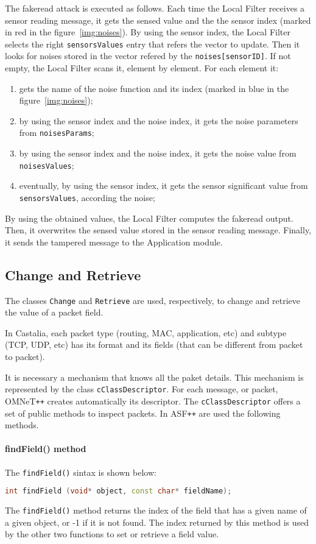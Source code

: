 The fakeread attack is executed as follows. Each time the Local Filter receives a sensor reading message, it gets the sensed value and the the sensor index (marked in red in the figure~\ref{img:noises}). By using the sensor index, the Local Filter selects the right \texttt{sensorsValues} entry that refers the vector to update. Then it looks for noises stored in the vector refered by the \texttt{noises[sensorID]}. If not empty, the Local Filter scans it, element by element. For each element it:
%
\begin{enumerate}
\item gets the name of the noise function and its index (marked in blue in the figure~\ref{img:noises});
\item by using the sensor index and the noise index, it gets the noise parameters from \texttt{noisesParams};
\item by using the sensor index and the noise index, it gets the noise value from \texttt{noisesValues};
\item eventually, by using the sensor index, it gets the sensor significant value from \texttt{sensorsValues}, according the noise;
\end{enumerate}

By using the obtained values, the Local Filter computes the fakeread output. Then, it overwrites the sensed value stored in the sensor reading message. Finally, it sends the tampered message to the Application module.




\subsection{Change and Retrieve}
The classes \texttt{Change} and \texttt{Retrieve} are used, respectively, to change and retrieve the value of a packet field. 

In Castalia, each packet type (routing, MAC, application, etc) and subtype (TCP, UDP, etc) has its format and its fields (that can be different from packet to packet).

It is necessary a mechanism that knows all the paket details. This mechanism is represented by the class \texttt{cClassDescriptor}. For each message, or packet, OMNeT\texttt{++} creates automatically its descriptor. The \texttt{cClassDescriptor} offers a set of public methods to inspect packets. In ASF\texttt{++} are used the following methods.

\paragraph{findField() method}
The \texttt{findField()} sintax is shown below:
%
\begin{lstlisting}[language={cpp}]
int findField (void* object, const char* fieldName);
\end{lstlisting}
%
The \texttt{findField()} method returns the index of the field that has a given name of a given object, or -1 if it is not found. The index returned by this method is used by the other two functions to set or retrieve a field value. 


